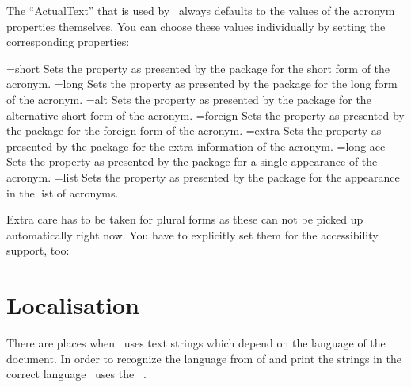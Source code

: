 \documentclass{acro-manual}
\begin{document}
The \enquote{ActualText} that is used by \acro\ always defaults to the values
of the acronym properties themselves.  You can choose these values
individually by setting the corresponding properties:
\begin{properties}
  \Default={short}
    Sets the  property as presented by the 
    package for the short form of the acronym.
  \Default={long}
    Sets the  property as presented by the 
    package for the long form of the acronym.
  \Default={alt}
    Sets the  property as presented by the 
    package for the alternative short form of the acronym.
  \Default={foreign}
    Sets the  property as presented by the 
    package for the foreign form of the acronym.
  \Default={extra}
    Sets the  property as presented by the 
    package for the extra information of the acronym.
  \Default={long-acc}
    Sets the  property as presented by the 
    package for a single appearance of the acronym.
  \Default={list}
    Sets the  property as presented by the 
    package for the appearance in the list of acronyms.
\end{properties}

Extra care has to be taken for plural forms as these can not be picked up
automatically right now.  You have to explicitly set them for the
accessibility support, too:
\begin{sourcecode}
\end{sourcecode}

\section{Localisation}\label{sec:localisation}
There are places when \acro\ uses text strings which depend on the language of
the document.  In order to recognize the language from  of
 and print the strings in the correct language \acro\ uses
the ~\cite{pkg:translations}.
\end{document}
